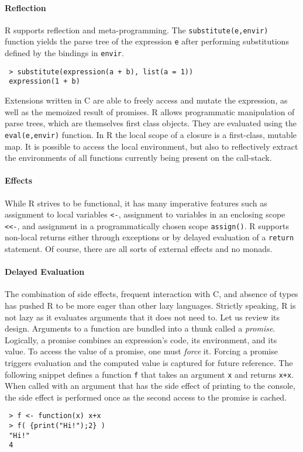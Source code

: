 \documentclass[review,nonacm,screen,acmsmall,anonymous=true]{acmart}
\newcommand{\authorcomment}[3]{}
\newcommand{\SK}[1]{\authorcomment{yellow}{SK}{#1}}
\newcommand{\code}[1]{\lstinline |#1|\xspace}
\begin{document}
\paragraph{Reflection}
R supports reflection and meta-programming. The \code{substitute(e,envir)}
function yields the parse tree of the expression \code{e} after performing
substitutions defined by the bindings in \code{envir}.
\vspace{-1mm}
\begin{lstlisting}
 > substitute(expression(a + b), list(a = 1))
 expression(1 + b)
\end{lstlisting}
\noindent
Extensions written in C are able to freely access and mutate the expression, as
well as the memoized result of promises. R allows
programmatic manipulation of parse trees, which are themselves first class
objects. They are evaluated using the \code{eval(e,envir)} function.
In R the local scope of a closure is a first-class, mutable map.
It is possible to access the local environment, but also to reflectively extract the environments of all
functions currently being present on the call-stack.

\paragraph{Effects} While R strives to be functional, it has many imperative
features such as assignment to local variables \code{<-}, assignment to
variables in an enclosing scope \code{<<-}, and assignment in a programmatically
chosen scope \code{assign()}. R supports non-local returns either through
exceptions or by delayed evaluation of a \code{return} statement. Of course,
there are all sorts of external effects and no monads.

\paragraph{Delayed Evaluation}

The combination of side effects, frequent interaction with C, and absence of
types has pushed R to be more eager than other lazy languages. Strictly
speaking, R is not lazy as it evaluates arguments that it does not need to.\SK{I didn't understand previous sentence}  Let
us review its design. Arguments to a function are bundled into a thunk called a
\emph{promise}. Logically, a promise combines an expression's code, its
environment, and its value. To access the value of a promise, one must
\emph{force} it. Forcing a promise triggers evaluation and the computed value is
captured for future reference. The following snippet defines a function \code{f}
that takes an argument \code x and returns \code{x+x}. When called with an argument
that has the side effect of printing to the console, the side effect is
performed once as the second access to the promise is cached.
\begin{lstlisting}
 > f <- function(x) x+x
 > f( {print("Hi!");2} )
 "Hi!"
 4
\end{lstlisting}
\end{document}

